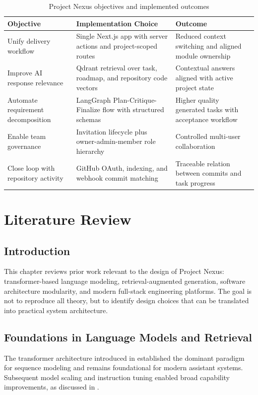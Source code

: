 \documentclass[a4paper, 11pt, oneside]{Dissertation}
\begin{document}
\begin{table}[H]
\centering
\begin{tabular}{|L{3.3cm}|L{4.3cm}|L{5.1cm}|}
\hline
\textbf{Objective} & \textbf{Implementation Choice} & \textbf{Outcome} \\
\hline
Unify delivery workflow & Single Next.js app with server actions and project-scoped routes & Reduced context switching and aligned module ownership \\
\hline
Improve AI response relevance & Qdrant retrieval over task, roadmap, and repository code vectors & Contextual answers aligned with active project state \\
\hline
Automate requirement decomposition & LangGraph Plan-Critique-Finalize flow with structured schemas & Higher quality generated tasks with acceptance workflow \\
\hline
Enable team governance & Invitation lifecycle plus owner-admin-member role hierarchy & Controlled multi-user collaboration \\
\hline
Close loop with repository activity & GitHub OAuth, indexing, and webhook commit matching & Traceable relation between commits and task progress \\
\hline
\end{tabular}
\caption{Project Nexus objectives and implemented outcomes}
\label{tab:intro-objectives}
\end{table}

\FloatBarrier

\chapter{Literature Review}
\label{ch:literature}

\section{Introduction}
This chapter reviews prior work relevant to the design of Project Nexus: transformer-based language modeling, retrieval-augmented generation, software architecture modularity, and modern full-stack engineering platforms. The goal is not to reproduce all theory, but to identify design choices that can be translated into practical system architecture.

\section{Foundations in Language Models and Retrieval}
The transformer architecture introduced in \cite{vaswani2017attention} established the dominant paradigm for sequence modeling and remains foundational for modern assistant systems. Subsequent model scaling and instruction tuning enabled broad capability improvements, as discussed in \cite{openai2023gpt4}.
\end{document}
